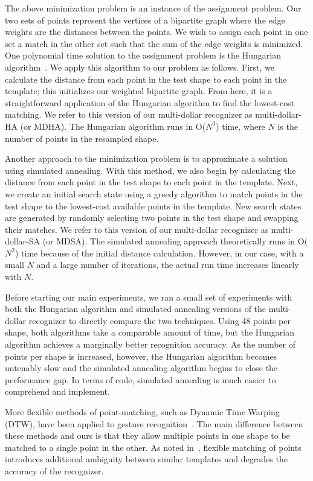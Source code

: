 \documentclass[final,5p,twocolumn]{elsarticle}
\begin{document}
The above minimization problem is an instance of the assignment problem. Our two sets of points represent the vertices of a bipartite graph where the edge weights are the distances between the points.  We wish to assign each point in one set a match in the other set such that the sum of the edge weights is minimized.  One polynomial time solution to the assignment problem is the Hungarian algorithm~\cite{munkres57}.  We apply this algorithm to our problem as follows.
First, we calculate the distance from each point in the test shape to each point in the template; this initializes our weighted bipartite graph.  From here, it is a straightforward application of the Hungarian algorithm to find the lowest-cost matching.  We refer to this version of our multi-dollar recognizer as multi-dollar-HA (or MDHA). The Hungarian algorithm runs in O($N^3$) time, where $N$ is the number of points in the resampled shape. 

Another approach to the minimization problem is to approximate a solution using simulated 
annealing.  With this method, we also begin by calculating the distance from each point in the test 
shape to each point in the template.  Next, we create an initial search state using a greedy algorithm to 
match points in the test shape to the lowest-cost available points in the template.  New search states are 
generated by randomly selecting two points in the test shape and swapping their matches.  We refer to this 
version of our multi-dollar recognizer as multi-dollar-SA (or MDSA). The 
simulated annealing approach theoretically runs in O($N^2$) time because of the initial distance 
calculation. However, in our case, with a small $N$ and a large number of iterations, the actual run 
time increases linearly with $N$.

Before starting our main experiments, 
we ran a small set of experiments with both the Hungarian algorithm 
and simulated annealing versions of 
the multi-dollar recognizer to directly compare the two techniques.  
Using 48 points per shape, both algorithms take a comparable amount 
of time, but the Hungarian algorithm achieves a marginally better recognition accuracy.  As the number
of points per shape is increased, however, the Hungarian algorithm becomes untenably slow and the 
simulated annealing algorithm begins to close the performance gap.  In terms of code, simulated 
annealing is much easier to comprehend and implement.

More flexible methods of point-matching, such as Dynamic Time Warping
(DTW), have been applied to gesture
recognition~\cite{wobbrock07, kristensson04}. The main difference between these
methods and ours is that they allow
multiple points in one shape to be matched to a single point in the
other. As noted in~\cite{kristensson04}, flexible matching of points
introduces additional ambiguity between similar templates and degrades
the accuracy of the recognizer.
\end{document}

